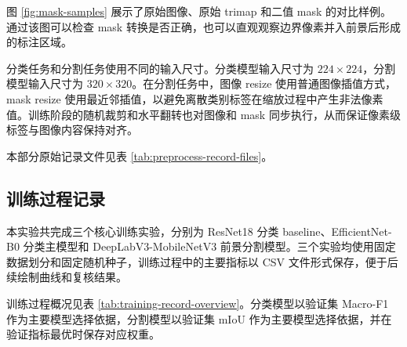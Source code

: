 \documentclass[UTF8,a4paper,12pt]{ctexart}
\begin{document}
图 \ref{fig:mask-samples} 展示了原始图像、原始 trimap 和二值 mask 的对比样例。通过该图可以检查 mask 转换是否正确，也可以直观观察边界像素并入前景后形成的标注区域。

分类任务和分割任务使用不同的输入尺寸。分类模型输入尺寸为 $224 \times 224$，分割模型输入尺寸为 $320 \times 320$。在分割任务中，图像 resize 使用普通图像插值方式，mask resize 使用最近邻插值，以避免离散类别标签在缩放过程中产生非法像素值。训练阶段的随机裁剪和水平翻转也对图像和 mask 同步执行，从而保证像素级标签与图像内容保持对齐。

本部分原始记录文件见表 \ref{tab:preprocess-record-files}。

\begin{table}[H]
\centering
\caption{mask 转换与预处理检查文件}
\label{tab:preprocess-record-files}
\end{table}

\subsection{训练过程记录}

本实验共完成三个核心训练实验，分别为 ResNet18 分类 baseline、EfficientNet-B0 分类主模型和 DeepLabV3-MobileNetV3 前景分割模型。三个实验均使用固定数据划分和固定随机种子，训练过程中的主要指标以 CSV 文件形式保存，便于后续绘制曲线和复核结果。

训练过程概况见表 \ref{tab:training-record-overview}。分类模型以验证集 Macro-F1 作为主要模型选择依据，分割模型以验证集 mIoU 作为主要模型选择依据，并在验证指标最优时保存对应权重。
\end{document}
